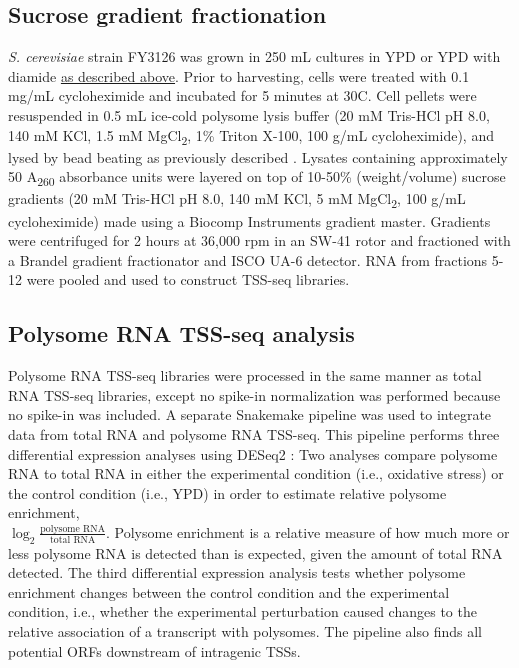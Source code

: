 \subsection{Sucrose gradient fractionation}

\textit{S. cerevisiae} strain FY3126 was grown in 250 mL cultures in YPD or YPD with diamide \hyperref[subsec:stress_growth_conditions]{as described above}.
Prior to harvesting, cells were treated with 0.1 mg/mL cycloheximide and incubated for 5 minutes at 30\textdegree C.
Cell pellets were resuspended in 0.5 mL ice-cold polysome lysis buffer (20 mM Tris-HCl pH 8.0, 140 mM KCl, 1.5 mM MgCl\textsubscript{2}, 1\% Triton X-100, 100 \textmu g/mL cycloheximide), and lysed by bead beating as previously described \citep{degennaro2013}.
Lysates containing approximately 50 A\textsubscript{260} absorbance units were layered on top of 10-50\% (weight/volume) sucrose gradients (20 mM Tris-HCl pH 8.0, 140 mM KCl, 5 mM MgCl\textsubscript{2}, 100 \textmu g/mL cycloheximide) made using a Biocomp Instruments gradient master.
Gradients were centrifuged for 2 hours at 36,000 rpm in an SW-41 rotor and fractioned with a Brandel gradient fractionator and ISCO UA-6 detector.
RNA from fractions 5-12 were pooled and used to construct TSS-seq libraries.

\subsection{Polysome RNA TSS-seq analysis}

Polysome RNA TSS-seq libraries were processed in the same manner as total RNA TSS-seq libraries, except no spike-in normalization was performed because no spike-in was included.
A separate Snakemake pipeline was used to integrate data from total RNA and polysome RNA TSS-seq.
This pipeline performs three differential expression analyses using DESeq2 \citep{love2014}: Two analyses compare polysome RNA to total RNA in either the experimental condition (i.e., oxidative stress) or the control condition (i.e., YPD) in order to estimate relative polysome enrichment,\\ $\log_2 \frac{\text{polysome RNA}}{\text{total RNA}}$.
Polysome enrichment is a relative measure of how much more or less polysome RNA is detected than is expected, given the amount of total RNA detected.
The third differential expression analysis tests whether polysome enrichment changes between the control condition and the experimental condition, i.e., whether the experimental perturbation caused changes to the relative association of a transcript with polysomes.
The pipeline also finds all potential ORFs downstream of intragenic TSSs.

